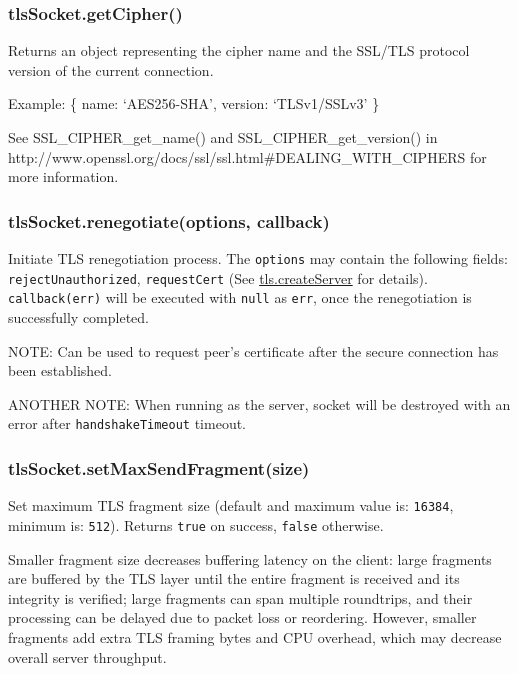 \subsubsection{tlsSocket.getCipher()}\label{tlssocket.getcipher}

Returns an object representing the cipher name and the SSL/TLS protocol
version of the current connection.

Example: \{ name: `AES256-SHA', version: `TLSv1/SSLv3' \}

See SSL\_CIPHER\_get\_name() and SSL\_CIPHER\_get\_version() in
http://www.openssl.org/docs/ssl/ssl.html\#DEALING\_WITH\_CIPHERS for
more information.

\subsubsection{tlsSocket.renegotiate(options,
callback)}\label{tlssocket.renegotiateoptions-callback}

Initiate TLS renegotiation process. The \texttt{options} may contain the
following fields: \texttt{rejectUnauthorized}, \texttt{requestCert} (See
\hyperref[tlsux5ftlsux5fcreateserverux5foptionsux5fsecureconnectionlistener]{tls.createServer}
for details). \texttt{callback(err)} will be executed with \texttt{null}
as \texttt{err}, once the renegotiation is successfully completed.

NOTE: Can be used to request peer's certificate after the secure
connection has been established.

ANOTHER NOTE: When running as the server, socket will be destroyed with
an error after \texttt{handshakeTimeout} timeout.

\subsubsection{tlsSocket.setMaxSendFragment(size)}\label{tlssocket.setmaxsendfragmentsize}

Set maximum TLS fragment size (default and maximum value is:
\texttt{16384}, minimum is: \texttt{512}). Returns \texttt{true} on
success, \texttt{false} otherwise.

Smaller fragment size decreases buffering latency on the client: large
fragments are buffered by the TLS layer until the entire fragment is
received and its integrity is verified; large fragments can span
multiple roundtrips, and their processing can be delayed due to packet
loss or reordering. However, smaller fragments add extra TLS framing
bytes and CPU overhead, which may decrease overall server throughput.

